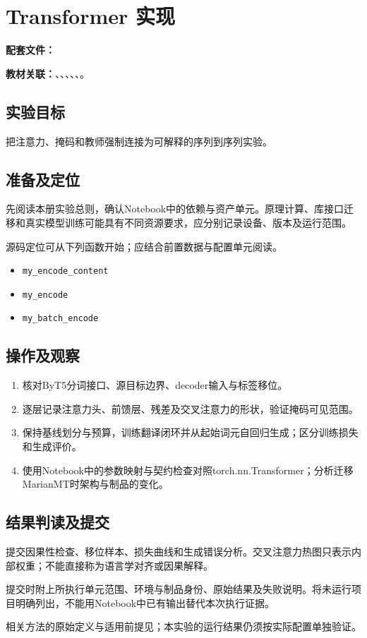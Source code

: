 \chapter{Transformer 实现}
\label{lab:30_transformer}

\noindent\textbf{配套文件：}\par
\noindent\textbf{教材关联：}、、、、、。

\section*{实验目标}
把注意力、掩码和教师强制连接为可解释的序列到序列实验。

\section*{准备及定位}
先阅读本册实验总则，确认Notebook中的依赖与资产单元。原理计算、库接口迁移和真实模型训练可能具有不同资源要求，应分别记录设备、版本及运行范围。

源码定位可从下列函数开始；应结合前置数据与配置单元阅读。
\begin{itemize}
\item \texttt{my\_encode\_content}
\item \texttt{my\_encode}
\item \texttt{my\_batch\_encode}
\end{itemize}

\section*{操作及观察}
\begin{enumerate}
\item 核对ByT5分词接口、源目标边界、decoder输入与标签移位。
\item 逐层记录注意力头、前馈层、残差及交叉注意力的形状，验证掩码可见范围。
\item 保持基线划分与预算，训练翻译闭环并从起始词元自回归生成；区分训练损失和生成评价。
\item 使用Notebook中的参数映射与契约检查对照torch.nn.Transformer；分析迁移MarianMT时架构与制品的变化。
\end{enumerate}

\section*{结果判读及提交}
提交因果性检查、移位样本、损失曲线和生成错误分析。交叉注意力热图只表示内部权重；不能直接称为语言学对齐或因果解释。

提交时附上所执行单元范围、环境与制品身份、原始结果及失败说明。将未运行项目明确列出，不能用Notebook中已有输出替代本次执行证据。

相关方法的原始定义与适用前提见\cite{vaswani2017attention}；本实验的运行结果仍须按实际配置单独验证。
